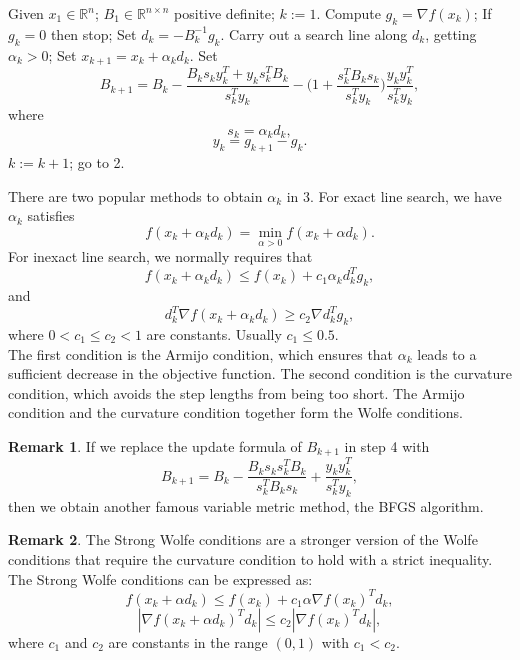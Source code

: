 \documentclass[12pt,a4paper,draft]{article}  %
\theoremstyle{definition}
\newtheorem{remark}{Remark}[section]
\numberwithin{equation}{section}
\newcommand{\RR}{\mathbb{R}}
\begin{document}
\begin{algorithm}[H]
\caption{DFP Algorithm}
\begin{algorithmic}[1]
\State Given $x_{1} \in \RR^{n}$; $B_{1} \in \RR^{n \times n}$ positive definite;
    $k:=1$.
\State Compute $g_k = \nabla f(x_k)$;
    If $g_k = 0$ then stop;
    Set $d_k = -B_k^{-1} g_k$.
\State Carry out a search line along $d_k$, getting $\alpha_k > 0$;
    Set $x_{k+1} = x_k + \alpha_k d_k$.
\State Set
    \[B_{k+1} = B_k - \frac{B_{k}s_{k}y_{k}^{T}+y_{k}s_{k}^{T}B_{k}}{s_k^T y_k} - \Bigg(1 + \frac{s_k^T B_k s_k}{s_k^T y_k} \Bigg)\frac{y_k y_k^T}{s_k^T y_k}, \tag{1.2}\]
    where \[s_k = \alpha_{k}d_{k},\tag{1.3}\]
      \[y_{k} = g_{k+1} - g_{k}.\tag{1.4}\]
\State $k := k + 1$; go to 2.
\end{algorithmic}
\end{algorithm}

There are two popular methods to obtain $\alpha_k$ in 3. For exact line search, we have $\alpha_k$ satisfies
\[f(x_k + \alpha_k d_k) = \min_{\alpha > 0} f(x_k + \alpha d_k).\tag{1.5}\]
For inexact line search, we normally requires that 
\[f(x_k + \alpha_k d_k) \leq f(x_k) + c_1 \alpha_k d_k^T g_k,\tag{1.6}\]
and
\[d_k^T \nabla f(x_k + \alpha_k d_k) \geq c_2 \nabla d_k^T g_k,\tag{1.7}\]
where $0 < c_1 \leq c_2 < 1$ are constants. Usually $c_1 \leq 0.5$.\\
The first condition is the Armijo condition, which ensures that  $\alpha_k$ leads to a sufficient decrease in the objective function. 
The second condition is the curvature condition, which avoids the step lengths from being too short. 
The Armijo condition and the curvature condition together form the Wolfe conditions.

\begin{remark}
    If we replace the update formula of $B_{k+1}$ in step 4 with
    \[B_{k+1} = B_k - \frac{B_{k}s_{k}s_{k}^{T}B_{k}}{s_k^T B_k s_k} + \frac{y_k y_k^T}{s_k^T y_k},\]
    then we obtain another famous variable metric method, the BFGS algorithm.
\end{remark}

\begin{remark}
The Strong Wolfe conditions are a stronger version of the Wolfe conditions that require the curvature condition to hold with a strict inequality. 
The Strong Wolfe conditions can be expressed as:
\[f(x_k + \alpha d_k) \leq f(x_k) + c_1 \alpha \nabla f(x_k)^T d_k,\]
\[|\nabla f(x_k + \alpha d_k)^T d_k| \leq c_2 |\nabla f(x_k)^T d_k|,\]
where $c_1$ and $c_2$ are constants in the range $(0, 1)$ with $c_1 < c_2$.
\end{remark}
\end{document}
